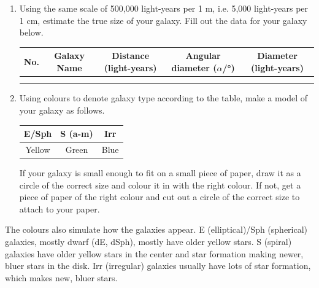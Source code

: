 \documentclass[main.tex]{subfiles}
\begin{document}
\begin{enumerate}
\item Using the same scale of 500,000 light-years per 1 m, i.e. 5,000 light-years per 1 cm, estimate the true size of your galaxy. Fill out the data for your galaxy below.
\begin{table}[h!]
\begin{center}
\begin{tabular}{|c|c|c|c|c|}\hline
No. & Galaxy Name & Distance (light-years) & Angular diameter ($\alpha$/\si{\degree}) & Diameter (light-years)\\\hline
&&&&\\
&&&&\\\hline
\end{tabular}
\end{center}
\label{tab:gal}
\end{table}
\vspace{-20pt}
\item Using colours to denote galaxy type according to the table, make a model of your galaxy as follows.
\begin{table}[h!]
\begin{center}
\begin{tabular}{|c|c|c|}\hline
E/Sph & S (a-m) & Irr \\\hline
Yellow & Green & Blue\\\hline
\end{tabular}
\end{center}
\label{tab:galcol}
\end{table}

If your galaxy is small enough to fit on a small piece of paper, draw it as a circle of the correct size and colour it in with the right colour. If not, get a piece of paper of the right colour and cut out a circle of the correct size to attach to your paper.
\end{enumerate}

The colours also simulate how the galaxies appear. E (elliptical)/Sph (spherical) galaxies, mostly dwarf (dE, dSph), mostly have older yellow stars. S (spiral) galaxies have older yellow stars in the center and star formation making newer, bluer stars in the disk. Irr (irregular) galaxies usually have lots of star formation, which makes new, bluer stars.
\end{document}
